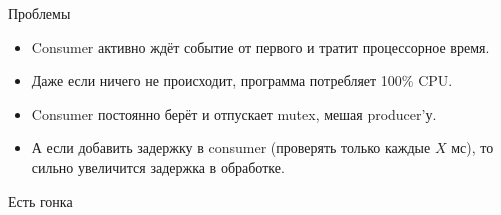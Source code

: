 \begin{frame}{Проблемы}
	\begin{itemize}
		\item Consumer активно ждёт событие от первого и тратит процессорное время.
		\item Даже если ничего не происходит, программа потребляет 100\% CPU.
		\item Consumer постоянно берёт и отпускает mutex, мешая producer'у.
		\item
			А если добавить задержку в consumer (проверять только каждые $X$ мс),
			то сильно увеличится задержка в обработке.
	\end{itemize}
\end{frame}

\begin{frame}{Есть гонка}
\end{frame}
